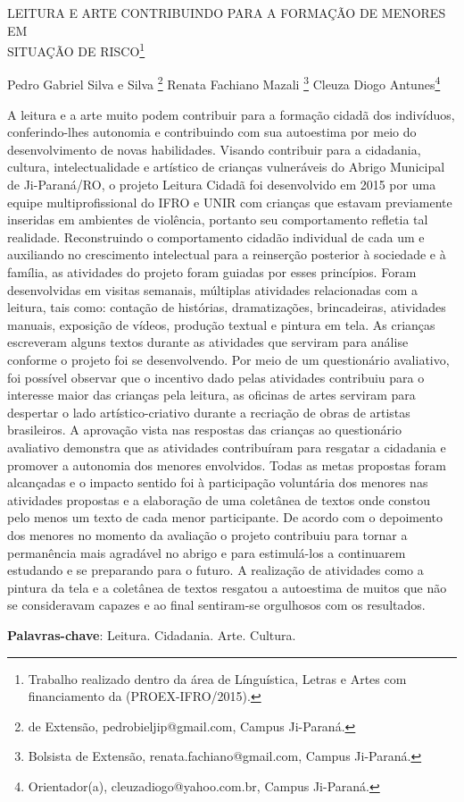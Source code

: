 \documentclass[article,12pt,onesidea,4paper,english,brazil]{abntex2}
\begin{document}
	
	
	\frenchspacing 
	
	\begin{center}
		\LARGE LEITURA E ARTE CONTRIBUINDO PARA A FORMAÇÃO DE MENORES EM \\SITUAÇÃO DE RISCO\footnote{Trabalho realizado dentro da área de Línguística, Letras e Artes com financiamento da (PROEX-IFRO/2015).}
		
		\normalsize
		Pedro Gabriel Silva e Silva \footnote{de Extensão, pedrobieljip@gmail.com, Campus Ji-Paraná.} 
		Renata Fachiano Mazali \footnote{Bolsista de Extensão, renata.fachiano@gmail.com, Campus Ji-Paraná.} 
		Cleuza Diogo Antunes\footnote{Orientador(a), cleuzadiogo@yahoo.com.br, Campus Ji-Paraná.} 
 
	\end{center}
	
	\noindent A leitura e a arte muito podem contribuir para a formação cidadã dos indivíduos, conferindo-lhes autonomia e contribuindo com sua autoestima por meio do desenvolvimento de novas habilidades. Visando contribuir para a cidadania, cultura, intelectualidade e artístico de crianças vulneráveis do Abrigo Municipal de Ji-Paraná/RO, o projeto Leitura Cidadã foi desenvolvido em 2015 por uma equipe multiprofissional do IFRO e UNIR com crianças que estavam previamente inseridas em ambientes de violência, portanto seu comportamento refletia tal realidade. Reconstruindo o comportamento cidadão individual de cada um e auxiliando no crescimento intelectual para a reinserção posterior à sociedade e à família, as atividades do projeto foram guiadas por esses princípios. Foram desenvolvidas em visitas semanais, múltiplas atividades relacionadas com a leitura, tais como: contação de histórias, dramatizações, brincadeiras, atividades manuais, exposição de vídeos, produção textual e pintura em tela. As crianças escreveram alguns textos durante as atividades que serviram para análise conforme o projeto foi se desenvolvendo. Por meio de um questionário avaliativo, foi possível observar que o incentivo dado pelas atividades contribuiu para o interesse maior das crianças pela leitura, as oficinas de artes serviram para despertar o lado artístico-criativo durante a recriação de obras de artistas brasileiros. A aprovação vista nas respostas das crianças ao questionário avaliativo demonstra que as atividades contribuíram para resgatar a cidadania e promover a autonomia dos menores envolvidos. Todas as metas propostas foram alcançadas e o impacto sentido foi à participação voluntária dos menores nas atividades propostas e a elaboração de uma coletânea de textos onde constou pelo menos um texto de cada menor participante. De acordo com o depoimento dos menores no momento da avaliação o projeto contribuiu para tornar a permanência mais agradável no abrigo e para estimulá-los a continuarem estudando e se preparando para o futuro. A realização de atividades como a pintura da tela e a coletânea de textos resgatou a autoestima de muitos que não se consideravam capazes e ao final sentiram-se orgulhosos com os resultados.
	
	\vspace{\onelineskip}
	
	\noindent
	\textbf{Palavras-chave}: Leitura. Cidadania. Arte. Cultura.
	
\end{document}
